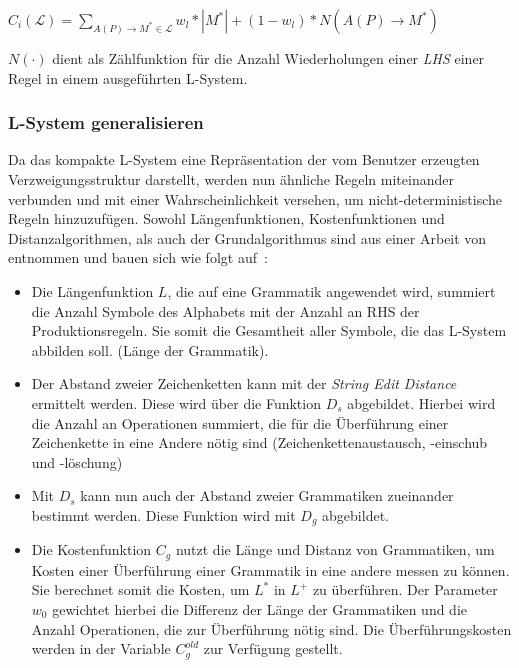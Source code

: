 \begin{algorithm}[caption={Kostenfunktion $C_i$ mit Gewichtung $w_l$}, label={alg4}]
$C_i(\mathcal{L})= \sum\limits_{A(P) \rightarrow M^* \in \mathcal{L}} w_l * |M^*| + (1 - w_l) * N(A(P)\rightarrow M^*)$
\end{algorithm}
$N(\cdot)$ dient als Zählfunktion für die Anzahl Wiederholungen einer \textit{LHS} einer Regel in einem
ausgeführten L-System.

\subsubsection*{L-System generalisieren}
Da das kompakte L-System eine Repräsentation der vom Benutzer erzeugten Verzweigungsstruktur darstellt, werden
nun ähnliche Regeln miteinander verbunden und mit einer Wahrscheinlichkeit versehen, um nicht-deterministische
Regeln hinzuzufügen.
Sowohl Längenfunktionen, Kostenfunktionen und Distanzalgorithmen, als auch der Grundalgorithmus sind aus einer Arbeit
von~\citeauthor{guo_2020} entnommen und bauen sich wie folgt auf~\cite{guo_2020}:

\begin{itemize}
    \item Die Längenfunktion $L$, die auf eine Grammatik angewendet wird, summiert die Anzahl Symbole des Alphabets mit
    der Anzahl an RHS der Produktionsregeln. Sie somit die Gesamtheit aller Symbole, die das L-System abbilden soll.
    (Länge der Grammatik).
    \item Der Abstand zweier Zeichenketten kann mit der \textit{String Edit Distance} ermittelt werden. Diese wird über
    die Funktion $D_s$ abgebildet. Hierbei wird die Anzahl an Operationen summiert, die für die Überführung einer Zeichenkette
    in eine Andere nötig sind (Zeichenkettenaustausch, -einschub und -löschung)
    \item Mit $D_s$ kann nun auch der Abstand zweier Grammatiken zueinander bestimmt werden. Diese Funktion wird mit
    $D_g$ abgebildet.
    \item Die Kostenfunktion $C_g$ nutzt die Länge und Distanz von Grammatiken, um Kosten einer Überführung einer Grammatik
    in eine andere messen zu können. Sie berechnet somit die Kosten, um $L^*$ in $L^+$ zu überführen.
    Der Parameter $w_0$ gewichtet hierbei die Differenz der Länge der Grammatiken und die Anzahl Operationen, die zur
    Überführung nötig sind. Die Überführungskosten werden in der Variable $C^{old}_g$ zur Verfügung gestellt.
\end{itemize}

